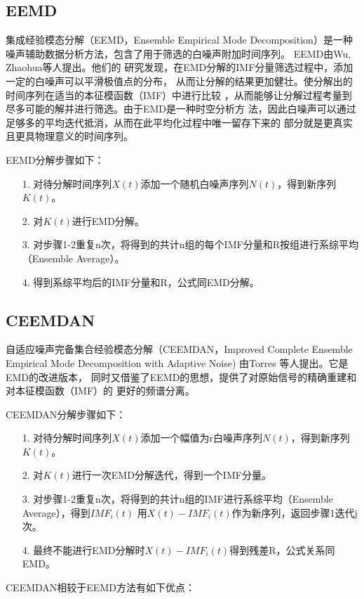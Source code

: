 \documentclass[AutoFakeBold]{LZUThesis}
\begin{document}
\subsection{EEMD}

集成经验模态分解（EEMD，Ensemble Empirical Mode Decomposition）是一种
噪声辅助数据分析方法，包含了用于筛选的白噪声附加时间序列。
EEMD由Wu, Zhaohua等人提出\cite{wu2009ensemble}。他们的
研究发现，在EMD分解的IMF分量筛选过程中，添加一定的白噪声可以平滑极值点的分布，
从而让分解的结果更加健壮。使分解出的时间序列在适当的本征模函数（IMF）中进行比较
，从而能够让分解过程考量到尽多可能的解并进行筛选。由于EMD是一种时空分析方
法，因此白噪声可以通过足够多的平均迭代抵消，从而在此平均化过程中唯一留存下来的
部分就是更真实且更具物理意义的时间序列。

EEMD分解步骤如下：
\begin{itemize}
\item[1. ] 对待分解时间序列$X(t)$添加一个随机白噪声序列$N(t)$，得到新序列$K(t)$。
\item[2. ] 对$K(t)$进行EMD分解。
\item[3. ] 对步骤1-2重复n次，将得到的共计n组的每个IMF分量和R按组进行系综平均（Ensemble Average）。
\item[4. ] 得到系综平均后的IMF分量和R，公式同EMD分解。
\end{itemize}

\subsection{CEEMDAN}
自适应噪声完备集合经验模态分解（CEEMDAN，Improved Complete Ensemble
Empirical Mode Decomposition with Adaptive Noise) 由Torres
等人提出\cite{torres2011complete}。它是EMD的改进版本，
同时又借鉴了EEMD的思想，提供了对原始信号的精确重建和对本征模函数（IMF）的
更好的频谱分离。

CEEMDAN分解步骤如下：
\begin{itemize}
\item[1. ] 对待分解时间序列$X(t)$添加一个幅值为r白噪声序列$N(t)$，得到新序列$K(t)$。
\item[2. ] 对$K(t)$进行一次EMD分解迭代，得到一个IMF分量。
\item[3. ] 对步骤1-2重复n次，将得到的共计n组的IMF进行系综平均（Ensemble Average），得到$IMF_i(t)$
用$X(t)-IMF_i(t)$作为新序列，返回步骤1迭代j次。
\item[4. ] 最终不能进行EMD分解时$X(t)-IMF_i(t)$得到残差R，公式关系同EMD。
\end{itemize}

CEEMDAN相较于EEMD方法有如下优点：
\end{document}
